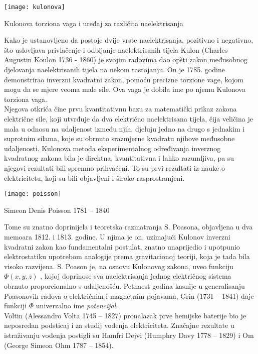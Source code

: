 	\begin{marginfigure}%
		\texttt{[image: kulonova]}
		\caption{Kulonova torziona vaga i uređaj za različita naelektrisanja}
		\label{fig:kulonova}
	\end{marginfigure}
	Kako je ustanovljeno da postoje dvije vrste naelektrisanja, pozitivno i negativno, što uslovljava privlačenje i odbijanje naelektrisanih tijela Kulon (Charles Augustin Koulon 1736 - 1860) je svojim radovima dao opšti zakon međusobnog djelovanja naelektrisanih tijela na nekom rastojanju. On je 1785. godine demonstrirao inverzni kvadratni zakon, pomoću precizne torzione vage, kojom mogu da se mjere veoma male sile. Ova vaga je dobila ime po njemu Kulonova torziona vaga.\\
	
	
	Njegova otkrića čine prvu kvantitativnu bazu za matematički prikaz zakona električne sile, koji utvrđuje da dva električno naelektrisana tijela, čija veličina je mala u odnosu na udaljenost između njih, djeluju jedno na drugo s jednakim i suprotnim silama, koje su obrnuto srazmjerne kvadratu njihove međusobne udaljenosti. Kulonova metoda eksperimentalnog određivanja inverznog kvadratnog zakona bila je direktna, kvantitativna i lahko razumljiva, pa su njegovi rezultati bili spremno prihvaćeni. To su prvi rezultati iz nauke o elektricitetu, koji su bili objavljeni i široko rasprostranjeni. \\
	\begin{marginfigure}%
		\texttt{[image: poisson]}
		\caption{Simeon Denis Poisson 1781 – 1840}
		\label{fig:poisson}
	\end{marginfigure} 
	Tome su znatno	doprinijela i teoretska razmatranja S. Poasona, objavljena u dva memoara 1812. i 1813. godine. U njima je on, uzimajući Kulonov inverzni kvadratni zakon kao fundamentalni postulat, znatno unaprijedio i upotpunio elektrostatiku upotrebom analogije prema gravitacionoj teoriji, koja je tada bila visoko razvijena. S. Poason je, na osnovu Kulonovog zakona, uveo funkciju $ \Phi(x,y,z) $ , kojoj doprinose sva naelektrisanja jednog električnog sistema obrnuto proporcionalno s udaljenošću. Petnaest godina kasnije u generalisanju Poasonovih radova o električnim i magnetnim pojavama, Grin (1731 – 1841) daje funkciji $ \Phi $ univerzalno ime \textit{potencijal}.\\
	
		
		
	Voltin (Alessandro Volta 1745 – 1827) pronalazak prve hemijske baterije bio je neposredan podsticaj i za studij vođenja elektriciteta. Značajne rezultate u istraživanju vođenja postigli su Hamfri Dejvi (Humphry Davy 1778 – 1829) i Om (George Simeon Ohm 1787 – 1854). \\
	
